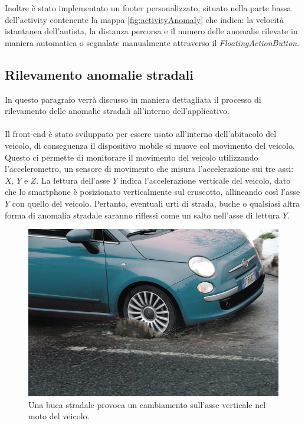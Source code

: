 \documentclass[a4paper, 11pt]{article} %
\begin{document}
Inoltre è stato implementato un footer personalizzato, situato nella parte bassa dell'activity contenente la mappa \ref{fig:activityAnomaly} che indica: la velocità istantanea dell'autista, la distanza percorsa e il numero delle anomalie rilevate in maniera automatica o segnalate manualmente attraverso il \textit{FloatingActionButton}.

\subsection*{Rilevamento anomalie stradali \cite{Mohamed2016}}

In questo paragrafo verrà discusso in maniera dettagliata il processo di rilevamento delle anomalie stradali all'interno dell'applicativo.\\\\
Il front-end è stato sviluppato per essere usato all'interno dell'abitacolo del veicolo, di conseguenza il dispositivo mobile si muove col movimento del veicolo. 
Questo ci permette di monitorare il movimento del veicolo utilizzando l'accelerometro, un sensore di movimento che misura l'accelerazione sui tre assi: $X$, $Y$ e $Z$. La lettura dell'asse $Y$ indica l'accelerazione verticale del veicolo, dato che
lo smartphone è posizionato verticalmente sul cruscotto, allineando così l'asse $Y$ con quello del veicolo. Pertanto, eventuali urti di strada, buche o qualsiasi altra forma di anomalia stradale saranno riflessi come un salto nell'asse di lettura $Y$.  
\begin{figure}[h]
	\begin{center}
		\includegraphics[width=\textwidth]{images/pothole.jpg}
	\end{center}
	\caption{Una buca stradale provoca un cambiamento sull'asse verticale nel moto del veicolo.}
	\label{fig:pothole}
\end{figure}
\end{document}
